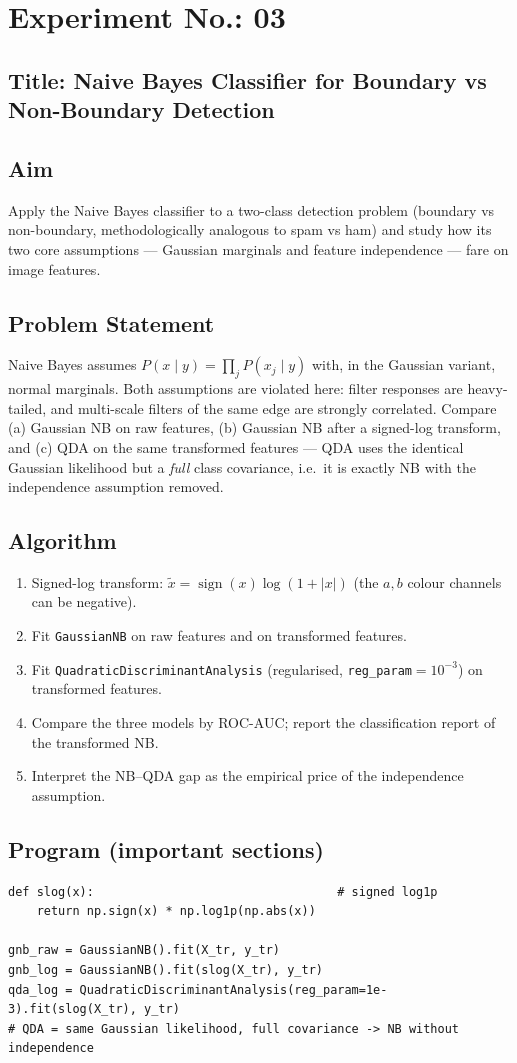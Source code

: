 \documentclass[11pt,a4paper]{article}
\newcommand{\labsection}[1]{\subsection*{#1}}
\begin{document}
\section*{Experiment No.: 03}
\labsection{Title: Naive Bayes Classifier for Boundary vs Non-Boundary Detection}

\labsection{Aim}
Apply the Naive Bayes classifier to a two-class detection problem (boundary vs non-boundary, methodologically analogous to spam vs ham) and study how its two core assumptions --- Gaussian marginals and feature independence --- fare on image features.

\labsection{Problem Statement}
Naive Bayes assumes $P(x\mid y)=\prod_j P(x_j\mid y)$ with, in the Gaussian variant, normal marginals. Both assumptions are violated here: filter responses are heavy-tailed, and multi-scale filters of the same edge are strongly correlated. Compare (a) Gaussian NB on raw features, (b) Gaussian NB after a signed-log transform, and (c) QDA on the same transformed features --- QDA uses the identical Gaussian likelihood but a \emph{full} class covariance, i.e.\ it is exactly NB with the independence assumption removed.

\labsection{Algorithm}
\begin{enumerate}[nosep]
  \item Signed-log transform: $\tilde x = \operatorname{sign}(x)\log(1+|x|)$ (the $a,b$ colour channels can be negative).
  \item Fit \texttt{GaussianNB} on raw features and on transformed features.
  \item Fit \texttt{QuadraticDiscriminantAnalysis} (regularised, \texttt{reg\_param}$=10^{-3}$) on transformed features.
  \item Compare the three models by ROC-AUC; report the classification report of the transformed NB.
  \item Interpret the NB--QDA gap as the empirical price of the independence assumption.
\end{enumerate}

\labsection{Program (important sections)}
\begin{lstlisting}
def slog(x):                                  # signed log1p
    return np.sign(x) * np.log1p(np.abs(x))

gnb_raw = GaussianNB().fit(X_tr, y_tr)
gnb_log = GaussianNB().fit(slog(X_tr), y_tr)
qda_log = QuadraticDiscriminantAnalysis(reg_param=1e-3).fit(slog(X_tr), y_tr)
# QDA = same Gaussian likelihood, full covariance -> NB without independence
\end{lstlisting}
\end{document}

